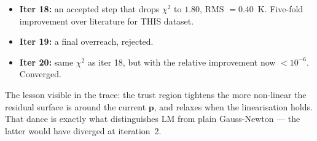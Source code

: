 \documentclass[11pt,a4paper]{article}
\newcommand{\pv}{\mathbf{p}}                          %
\begin{document}
\begin{example}
\begin{itemize}[leftmargin=*,nosep]
  \item \textbf{Iter 18:} an accepted step that drops $\chi^2$ to
        $1.80$, RMS $= 0.40$~K. Five-fold improvement over literature
        for THIS dataset.
  \item \textbf{Iter 19:} a final overreach, rejected.
  \item \textbf{Iter 20:} same $\chi^2$ as iter 18, but with the
        relative improvement now $< 10^{-6}$. Converged.
\end{itemize}
The lesson visible in the trace: the trust region tightens the more
non-linear the residual surface is around the current $\pv$, and
relaxes when the linearisation holds. That dance is exactly what
distinguishes LM from plain Gauss-Newton --- the latter would have
diverged at iteration~2.
\end{example}
\end{document}
